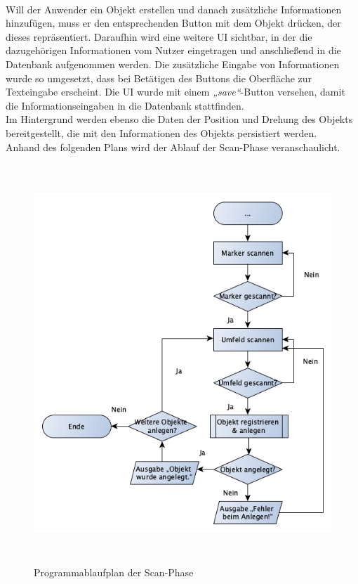 \pagebreak
\\
Will der Anwender ein Objekt erstellen und danach zusätzliche Informationen hinzufügen, muss er den entsprechenden Button mit dem Objekt drücken, der 
dieses repräsentiert. Daraufhin wird eine weitere \acs{UI} sichtbar, in der die dazugehörigen Informationen vom Nutzer eingetragen und anschließend 
in die Datenbank aufgenommen werden. Die zusätzliche Eingabe von Informationen wurde so umgesetzt, dass bei Betätigen des Buttons die Oberfläche zur 
Texteingabe erscheint. Die \acs{UI} wurde mit einem \textit{„save“}-Button versehen, damit die Informationseingaben in die Datenbank stattfinden. 
\\ 
Im Hintergrund werden ebenso die Daten der Position und Drehung des 
Objekts bereitgestellt, die mit den Informationen des Objekts persistiert werden.
\\ 
\linebreak
Anhand des folgenden Plans wird der Ablauf der Scan-Phase veranschaulicht.
\begin{figure}[hbt!]
    \centering
    \includegraphics[width=15cm,height=15cm,keepaspectratio]{4Umsetzung/Bilder/scanPAP.png}
    \caption{Programmablaufplan der Scan-Phase}
    \label{pic:startmenu}
\end{figure}